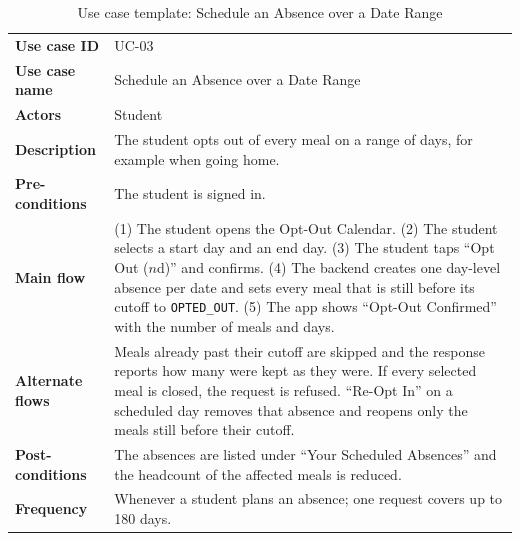 \documentclass[11pt,a4paper]{article}
\begin{document}
\begin{table}[H]
\centering
\caption{Use case template: Schedule an Absence over a Date Range}
\label{tab:uc3}
\begin{tabular}{@{}L{3.1cm}L{11.7cm}@{}}
\toprule
\textbf{Use case ID} & UC-03\\
\textbf{Use case name} & Schedule an Absence over a Date Range\\
\textbf{Actors} & Student\\
\textbf{Description} & The student opts out of every meal on a range of days,
for example when going home.\\
\textbf{Pre-conditions} & The student is signed in.\\
\textbf{Main flow} & (1) The student opens the Opt-Out Calendar. (2) The student
selects a start day and an end day. (3) The student taps ``Opt Out ($n$d)'' and
confirms. (4) The backend creates one day-level absence per date and sets every
meal that is still before its cutoff to \texttt{OPTED\_OUT}. (5) The app shows
``Opt-Out Confirmed'' with the number of meals and days.\\
\textbf{Alternate flows} & Meals already past their cutoff are skipped and the
response reports how many were kept as they were. If every selected meal is
closed, the request is refused. ``Re-Opt In'' on a scheduled day removes that
absence and reopens only the meals still before their cutoff.\\
\textbf{Post-conditions} & The absences are listed under ``Your Scheduled
Absences'' and the headcount of the affected meals is reduced.\\
\textbf{Frequency} & Whenever a student plans an absence; one request covers up to 180 days.\\
\bottomrule
\end{tabular}
\end{table}
\end{document}
